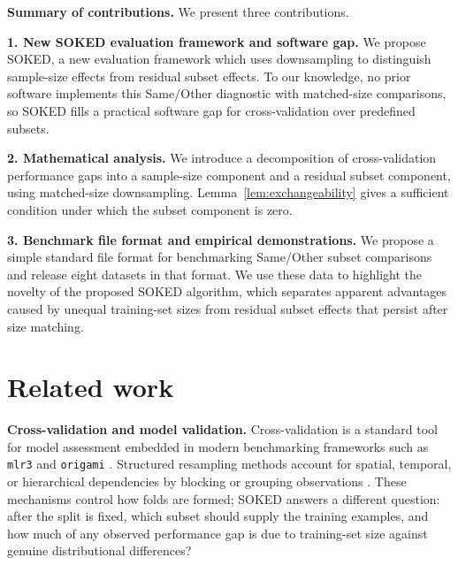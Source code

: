 \documentclass{article}
\begin{document}
\textbf{Summary of contributions.}
We present three contributions.

\textbf{1. New SOKED evaluation framework and software gap.}
  We propose SOKED, a new evaluation framework which uses downsampling to distinguish sample-size effects from residual subset effects.
  To our knowledge, no prior software implements this Same/Other diagnostic with matched-size comparisons, so SOKED fills a practical software gap for cross-validation over predefined subsets.

  
\textbf{2. Mathematical analysis.}
  We introduce a decomposition of cross-validation performance gaps into a sample-size component and a residual subset component, using matched-size downsampling.
  Lemma~\ref{lem:exchangeability} gives a sufficient condition under which the subset component is zero.

\textbf{3. Benchmark file format and empirical demonstrations.}
  We propose a simple standard file format for benchmarking Same/Other subset comparisons and release eight datasets in that format.
  We use these data to highlight the novelty of the proposed SOKED algorithm, which separates apparent advantages caused by unequal training-set sizes from residual subset effects that persist after size matching.


\section{Related work}

\textbf{Cross-validation and model validation.}
Cross-validation is a standard tool for model assessment \citep{stone1974cross,geisser1975predictive,Arl_Cel:2010:surveyCV} embedded in modern benchmarking frameworks such as \texttt{mlr3} and \texttt{origami} \citep{Bischl2024,coyle2018origami}.
Structured resampling methods account for spatial, temporal, or hierarchical dependencies by blocking or grouping observations \citep{roberts2017,brenning2005,valavi2019,schratz2024}.
These mechanisms control how folds are formed; SOKED answers a different question: after the split is fixed, which subset should supply the training examples, and how much of any observed performance gap is due to training-set size against genuine distributional differences?
\end{document}
